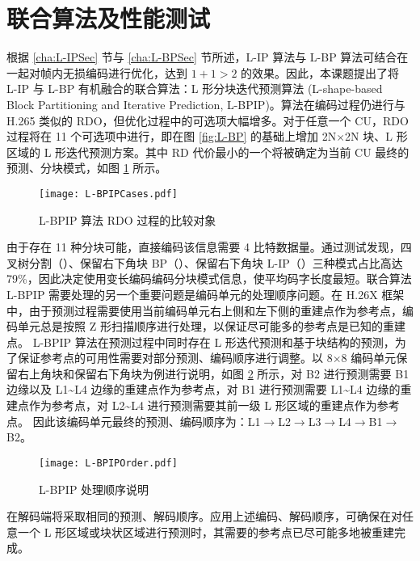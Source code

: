 \section{联合算法及性能测试}
根据 \ref{cha:L-IPSec} 节与 \ref{cha:L-BPSec} 节所述，L-IP 算法与 L-BP 算法可结合在一起对帧内无损编码进行优化，达到 $1+1>2$ 的效果。因此，本课题提出了将 L-IP 与 L-BP 有机融合的联合算法：L 形分块迭代预测算法 (L-shape-based Block Partitioning and Iterative Prediction, L-BPIP)。算法在编码过程仍进行与 H.265 类似的 RDO，但优化过程中的可选项大幅增多。对于任意一个 CU，RDO 过程将在 11 个可选项中进行，即在图 \ref{fig:L-BP} 的基础上增加 2N$\times$2N 块、L 形区域的 L 形迭代预测方案。其中 RD 代价最小的一个将被确定为当前 CU 最终的预测、分块模式，如图 \ref{fig:L-BPIPCases} 所示。
\begin{figure}[hbt]
    \centering
    \texttt{[image: L-BPIPCases.pdf]}
    \caption{L-BPIP 算法 RDO 过程的比较对象}
    \label{fig:L-BPIPCases}
\end{figure}

由于存在 11 种分块可能，直接编码该信息需要 4 比特数据量。通过测试发现，四叉树分割（）、保留右下角块 BP（）、保留右下角块 L-IP（）三种模式占比高达 79\%，因此决定使用变长编码编码分块模式信息，使平均码字长度最短。联合算法 L-BPIP 需要处理的另一个重要问题是编码单元的处理顺序问题。在 H.26X 框架中，由于预测过程需要使用当前编码单元右上侧和左下侧的重建点作为参考点，编码单元总是按照 Z 形扫描顺序进行处理，以保证尽可能多的参考点是已知的重建点。
L-BPIP 算法在预测过程中同时存在 L 形迭代预测和基于块结构的预测，为了保证参考点的可用性需要对部分预测、编码顺序进行调整。以 8$\times$8 编码单元保留右上角块和保留右下角块为例进行说明，如图 \ref{fig:L-BPIPOrder} 所示，对 B2 进行预测需要 B1 边缘以及 L1\textasciitilde L4 边缘的重建点作为参考点，对 B1 进行预测需要 L1\textasciitilde L4 边缘的重建点作为参考点，对 L2\textasciitilde L4 进行预测需要其前一级 L 形区域的重建点作为参考点。
因此该编码单元最终的预测、编码顺序为：L1$\to$L2$\to$L3$\to$L4$\to$B1$\to$B2。
\begin{figure}[hbt]
    \centering
    \texttt{[image: L-BPIPOrder.pdf]}
    \caption{L-BPIP 处理顺序说明}
    \label{fig:L-BPIPOrder}
\end{figure}
在解码端将采取相同的预测、解码顺序。应用上述编码、解码顺序，可确保在对任意一个 L 形区域或块状区域进行预测时，其需要的参考点已尽可能多地被重建完成。

